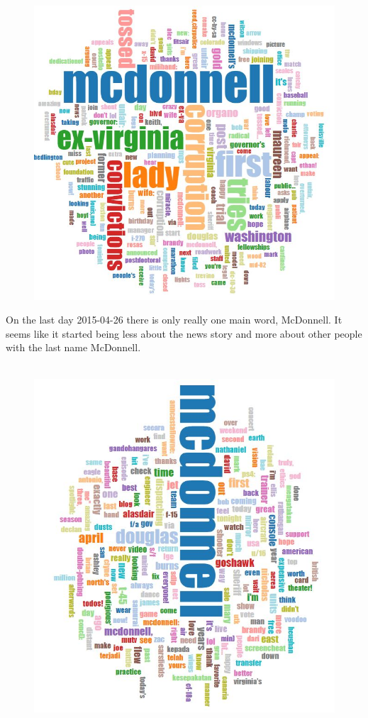 \documentclass[12pt]{article}
\begin{document}
\begin{figure}[H]
    \centering
    \includegraphics[scale=0.7]{20150422.JPG}
\end{figure}

On the last day 2015-04-26 there is only really one main word, McDonnell.  It seems like it started being less about the news story and more about other people with the last name McDonnell.

\begin{figure}[H]
    \centering
    \includegraphics[scale=0.7]{20150426.JPG}
\end{figure}
\end{document}

